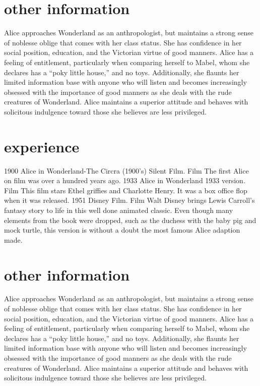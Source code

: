 \documentclass[]{mcec-cv}
\begin{document}
\section{other information}
Alice approaches Wonderland as an anthropologist, but maintains a strong sense of noblesse oblige that comes with her class status. She has confidence in her social position, education, and the Victorian virtue of good manners. Alice has a feeling of entitlement, particularly when comparing herself to Mabel, whom she declares has a “poky little house,” and no toys. Additionally, she flaunts her limited information base with anyone who will listen and becomes increasingly obsessed with the importance of good manners as she deals with the rude creatures of Wonderland. Alice maintains a superior attitude and behaves with solicitous indulgence toward those she believes are less privileged.

\section{experience}

\begin{twenty}
  \twentyitem
    {1900}
    {Alice in Wonderland-The Circra (1900's) Silent Film.}
    {Film}
    {The first Alice on film was over a hundred years ago.}
  \twentyitem
    {1933}
    {Alice in Wonderland 1933 version.}
    {Film}
    {This film stars Ethel griffies and Charlotte Henry. It was a box office flop when it was released.}
\twentyitem
    {1951}
    {Disney Film.}
    {Film}
    {Walt Disney brings Lewis Carroll's fantasy story to life in this well done animated classic. Even though many elements from the book were dropped, such as the duchess with the baby pig and mock turtle, this version is without a doubt the most famous Alice adaption made.}

\end{twenty}

\section{other information}
Alice approaches Wonderland as an anthropologist, but maintains a strong sense of noblesse oblige that comes with her class status. She has confidence in her social position, education, and the Victorian virtue of good manners. Alice has a feeling of entitlement, particularly when comparing herself to Mabel, whom she declares has a “poky little house,” and no toys. Additionally, she flaunts her limited information base with anyone who will listen and becomes increasingly obsessed with the importance of good manners as she deals with the rude creatures of Wonderland. Alice maintains a superior attitude and behaves with solicitous indulgence toward those she believes are less privileged.
\end{document}
